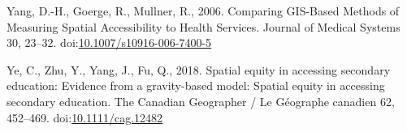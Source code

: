 \documentclass[]{elsarticle} %
\newlength{\cslhangindent}
\newlength{\cslentryspacingunit} %
\newenvironment{CSLReferences}[2] %
 {%
  \setlength{\parindent}{0pt}
  \ifodd #1
  \let\oldpar\par
  \def\par{\hangindent=\cslhangindent\oldpar}
  \fi
  \setlength{\parskip}{#2\cslentryspacingunit}
 }%
 {}
\begin{document}
\begin{CSLReferences}{1}{0}
\leavevmode{}%
Yang, D.-H., Goerge, R., Mullner, R., 2006. Comparing {GIS}-{Based}
{Methods} of {Measuring} {Spatial} {Accessibility} to {Health}
{Services}. Journal of Medical Systems 30, 23--32.
doi:\href{https://doi.org/10.1007/s10916-006-7400-5}{10.1007/s10916-006-7400-5}

\leavevmode{}%
Ye, C., Zhu, Y., Yang, J., Fu, Q., 2018. Spatial equity in accessing
secondary education: {Evidence} from a gravity-based model: {Spatial}
equity in accessing secondary education. The Canadian Geographer / Le
Géographe canadien 62, 452--469.
doi:\href{https://doi.org/10.1111/cag.12482}{10.1111/cag.12482}

\end{CSLReferences}
\end{document}
